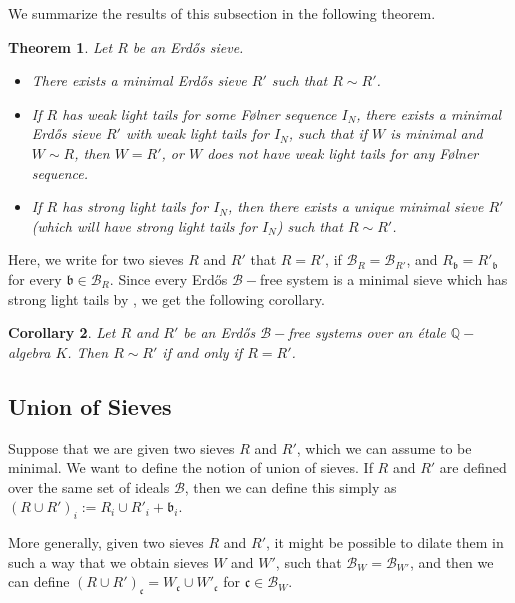 \documentclass[a4paper,11pt,reqno]{amsart}
\theoremstyle{plain}
\newtheorem{theorem}{Theorem}[section]
\newtheorem{corollary}[theorem]{Corollary}
\theoremstyle{remark}
\newcommand{\q}{\mathbb{Q}}
\newcommand{\cb}{\mathcal{B}}
\newcommand{\gb}{\mathfrak{b}}
\newcommand{\gc}{\mathfrak{c}}
\begin{document}
		We summarize the results of this subsection in the following theorem.
		
		\begin{theorem}
			\label{thm: equivalence minimal sieves main}
			Let $R$ be an Erdős sieve. 
			\begin{itemize}
				\item There exists a minimal Erdős sieve $R'$ such that $R \sim R'$.
				\item If $R$ has weak light tails for some Følner sequence $I_N$, there exists a minimal Erdős sieve $R'$  with weak light tails for $I_N$, such that if $W$ is minimal and $W \sim R$, then $W = R'$, or $W$ does not have weak light tails for any Følner sequence.
				\item If $R$ has strong light tails for $I_N$, then there exists a unique minimal sieve $R'$ (which will have strong light tails for $I_N$) such that $R \sim R'$. 
			\end{itemize}
		\end{theorem}
		
		Here, we write for two sieves $R$ and $R'$ that $R= R'$, if $\cb_R = \cb_{R'}$, and $R_\gb = R'_\gb$ for every $\gb \in \cb_R$. Since every Erdős $\cb-$free system is a minimal sieve which has strong light tails by  , we get the following corollary.
		
		
		\begin{corollary}
			\label{crl: Bfree systems free elements equal iff same support}
			Let $R$ and $R'$ be an Erdős $\cb-$free systems over an étale $\q-$algebra $K$. Then $R \sim R'$ if and only if $R = R'$.
		\end{corollary}
		
		
		
		\subsection{Union of Sieves}
		
		Suppose that we are given two sieves $R$ and $R'$, which we can assume to be minimal. We want to define the notion of union of sieves. If $R$ and $R'$ are defined over the same set of ideals $\cb$, then we can define this simply as $(R\cup R')_i := R_i \cup R'_i + \gb_i$.
		
		
		More generally, given two sieves $R$ and $R'$, it might be possible to dilate them in such a way that we obtain sieves $W$ and $W'$, such that $\cb_W = \cb_{W'}$, and then we can define $(R\cup R')_\gc = W_\gc \cup W'_\gc $ for $\gc \in \cb_W$.  
		
\end{document}
